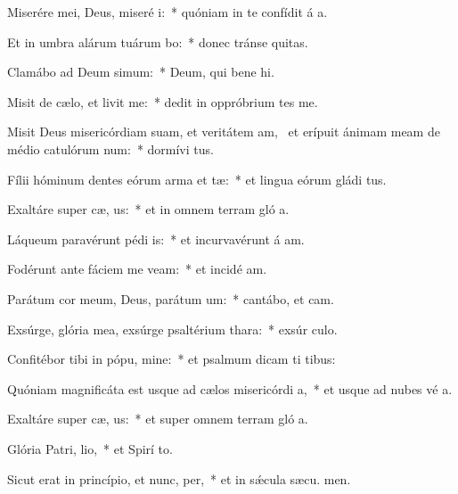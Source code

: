 \item Miserére mei, Deus, miseré i:~* quóniam in te confídit á a.
\item Et in umbra alárum tuárum bo:~* donec tránse quitas.
\item Clamábo ad Deum simum:~* Deum, qui bene hi.
\item Misit de cælo, et livit me:~* dedit in oppróbrium tes me.
\item Misit Deus misericórdiam suam, et veritátem am,~\pscross{} et erípuit ánimam meam de médio catulórum num:~* dormívi tus.
\item Fílii hóminum dentes eórum arma et tæ:~* et lingua eórum gládi tus.
\item Exaltáre super cæ, us:~* et in omnem terram gló a.
\item Láqueum paravérunt pédi is:~* et incurvavérunt á am.
\item Fodérunt ante fáciem me veam:~* et incidé  am.
\item Parátum cor meum, Deus, parátum  um:~* cantábo, et  cam.
\item Exsúrge, glória mea, exsúrge psaltérium  thara:~* exsúr culo.
\item Confitébor tibi in pópu, mine:~* et psalmum dicam ti  tibus:
\item Quóniam magnificáta est usque ad cælos misericórdi a,~* et usque ad nubes vé a.
\item Exaltáre super cæ, us:~* et super omnem terram gló a.
\item Glória Patri,  lio,~* et Spirí to.
\item Sicut erat in princípio, et nunc,  per,~* et in sǽcula sæcu. men.
